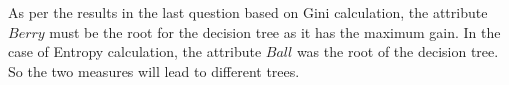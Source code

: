 \begin{enumerate}
\begin{enumerate}
  As per the results in the last question based on Gini calculation, the attribute $Berry$ must be the root for the decision tree as it has the maximum gain. In the case of Entropy calculation, the attribute $Ball$ was the root of the decision tree. So the two measures will lead to different trees.
\end{enumerate}
\end{enumerate}





